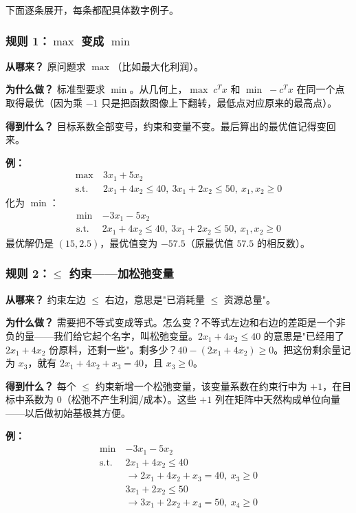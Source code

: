 下面逐条展开，每条都配具体数字例子。

\subsubsection{规则 1：$\max$ 变成 $\min$}

\textbf{从哪来？} 原问题求 $\max$（比如最大化利润）。

\textbf{为什么做？} 标准型要求 $\min$。从几何上，$\max\;c^Tx$ 和 $\min\;-c^Tx$ 在同一个点取得最优（因为乘 $-1$ 只是把函数图像上下翻转，最低点对应原来的最高点）。

\textbf{得到什么？} 目标系数全部变号，约束和变量不变。最后算出的最优值记得变回来。

\textbf{例：}
\[
\begin{aligned}
\max\ & 3x_1 + 5x_2 \\
\text{s.t.}\ & 2x_1+4x_2\le 40,\ 3x_1+2x_2\le 50,\ x_1,x_2\ge 0
\end{aligned}
\]
化为 $\min$：
\[
\begin{aligned}
\min\ & -3x_1 - 5x_2 \\
\text{s.t.}\ & 2x_1+4x_2\le 40,\ 3x_1+2x_2\le 50,\ x_1,x_2\ge 0
\end{aligned}
\]
最优解仍是 $(15,2.5)$，最优值变为 $-57.5$（原最优值 $57.5$ 的相反数）。

\subsubsection{规则 2：$\le$ 约束——加松弛变量}

\textbf{从哪来？} 约束左边 $\le$ 右边，意思是"已消耗量 $\le$ 资源总量"。

\textbf{为什么做？} 需要把不等式变成等式。怎么变？不等式左边和右边的差距是一个非负的量——我们给它起个名字，叫松弛变量。$2x_1+4x_2\le 40$ 的意思是"已经用了 $2x_1+4x_2$ 份原料，还剩一些"。剩多少？$40-(2x_1+4x_2) \ge 0$。把这份剩余量记为 $x_3$，就有 $2x_1+4x_2+x_3=40$，且 $x_3\ge 0$。

\textbf{得到什么？} 每个 $\le$ 约束新增一个松弛变量，该变量系数在约束行中为 $+1$，在目标中系数为 0（松弛不产生利润/成本）。这些 $+1$ 列在矩阵中天然构成单位向量——以后做初始基极其方便。

\textbf{例：}
\[
\begin{aligned}
\min\ & -3x_1 - 5x_2 \\
\text{s.t.}\ & 2x_1 + 4x_2 \le 40 \\
&\to 2x_1 + 4x_2 + x_3 = 40,\ x_3\ge 0 \\
& 3x_1 + 2x_2 \le 50 \\
&\to 3x_1 + 2x_2 + x_4 = 50,\ x_4\ge 0
\end{aligned}
\]

